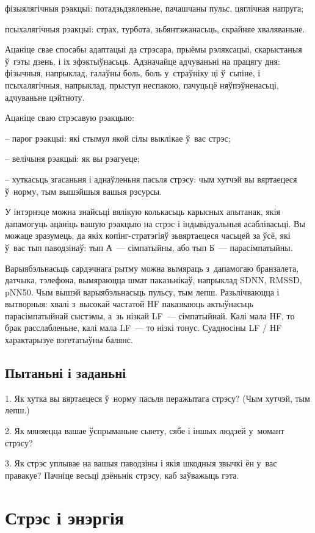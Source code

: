 фізыялягічныя рэакцыі: потадзьдзяленьне, пачашчаны пульс, цяглічная напруга;

псыхалягічныя рэакцыі: страх, турбота, зьбянтэжанасьць, скрайняе хваляваньне. 

Ацаніце свае спосабы адаптацыі да стрэсара, прыёмы рэляксацыі, скарыстаныя ў~гэты дзень, і іх эфэктыўнасьць. Адзначайце адчуваньні на працягу дня: фізычныя, напрыклад, галаўны боль, боль у~страўніку ці ў~сьпіне, і псыхалягічныя, напрыклад, прыступ неспакою, пачуцьцё няўпэўненасьці, адчуваньне цэйтноту.

Ацаніце сваю стрэсавую рэакцыю:

– парог рэакцыі: які стымул якой сілы выклікае ў~вас стрэс;

– велічыня рэакцыі: як вы рэагуеце;

– хуткасьць згасаньня і аднаўленьня пасьля стрэсу: чым хутчэй вы вяртаецеся ў~норму, тым вышэйшыя вашыя рэсурсы.

У інтэрнэце можна знайсьці вялікую колькасьць карысных апытанак, якія дапамогуць ацаніць вашую рэакцыю на стрэс і індывідуальныя асаблівасьці. Вы можаце зразумець, да якіх копінг-стратэгіяў зьвяртаецеся часьцей за ўсё, які ў~вас тып паводзінаў: тып А~--- сімпатыйны, або тып Б~--- парасімпатыйны.

Варыябэльнасьць сардэчнага рытму можна вымяраць з~дапамогаю бранзалета, датчыка, тэлефона, вымяраюцца шмат паказьнікаў, напрыклад SDNN, RMSSD, pNN50. Чым вышэй варыябэльнасьць пульсу, тым лепш. Разьлічваюцца і вытворныя: хвалі з~высокай частатой HF паказваюць актыўнасьць парасімпатыйнай сыстэмы, а~зь нізкай LF~--- сімпатыйнай. Калі мала HF, то брак расслабленьне, калі мала LF~--- то нізкі тонус. Суадносіны LF / HF характарызуе вэгетатыўны балянс.

\subsection*{Пытаньні і заданьні}

1. Як хутка вы вяртаецеся ў~норму пасьля перажытага стрэсу? (Чым хутчэй, тым лепш.)

2. Як мяняецца вашае ўспрыманьне сьвету, сябе і іншых людзей у~момант стрэсу?

3. Як стрэс уплывае на вашыя паводзіны і якія шкодныя звычкі ён у~вас правакуе? Пачніце весьці дзёньнік стрэсу, каб заўважыць гэта.


\section{Стрэс і энэргія}

